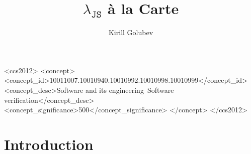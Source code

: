 \documentclass[sigplan,nonacm]{acmart}
\begin{document}
\title{$\lambda_{\texttt{JS}}$ à la Carte}

\author{Kirill Golubev}


\renewcommand{\shortauthors}{Golubev}

\begin{CCSXML}
<ccs2012>
 <concept>
<concept_id>10011007.10010940.10010992.10010998.10010999</concept_id>
<concept_desc>Software and its engineering~Software verification</concept_desc>
<concept_significance>500</concept_significance>
</concept>
</ccs2012>
\end{CCSXML}




\maketitle

\section{Introduction}
\end{document}
